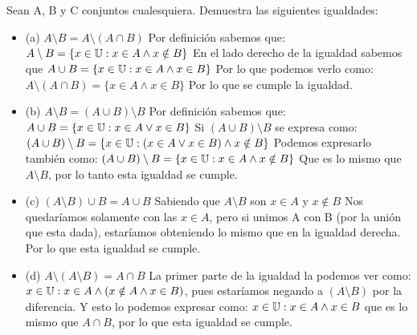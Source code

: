 \section{}
Sean A, B y C conjuntos cualesquiera. Demuestra las siguientes igualdades:
\begin{itemize}
	\item (a) $A \setminus B = A \setminus (A \cap B)$\newline
	Por definición sabemos que: $A \setminus B = \{ x \in \mathbb{U} : x \in A \wedge x \notin B \}$\newline
	En el lado derecho de la igualdad sabemos que \newline
	$A \cup B = \{ x \in \mathbb{U} : x \in A \wedge x \in B \} $\newline
	Por lo que podemos verlo como: $A \setminus (A  \cap B) = \{ x \in A \wedge x \in B \}$\newline
	Por lo que se cumple la igualdad.
	
	
	\item (b) $A \setminus B = (A \cup B) \setminus B$\newline
	Por definición sabemos que:\newline
	$A \cup B = \{x \in \mathbb{U} : x\in A \lor x\in B \}$\newline
	Si $(A \cup B ) \setminus B$ se expresa como:\newline
	$(A \cup B ) \setminus B = \{x \in \mathbb{U} : (x \in A \lor x \in B) \wedge x \notin B \}$\newline
	Podemos expresarlo también como:\newline
	$(A \cup B) \setminus B = \{ x \in \mathbb{U} : x\in A \wedge x \notin B \}$\newline
	Que es lo mismo que $A\setminus B$, por lo tanto esta igualdad se cumple.
	
	\item (c) $(A \setminus B) \cup B = A \cup B$\newline
	Sabiendo que $A \setminus B$ son $x \in A$ y $x \notin B$\newline
	Nos quedaríamos solamente con las $x \in A$, pero si unimos A con B (por la unión que esta dada), estaríamos obteniendo lo mismo que en la igualdad derecha. Por lo que esta igualdad se cumple.
		
	\item (d) $A \setminus (A \setminus B) = A \cap B$\newline
La primer parte de la igualdad la podemos ver como: \newline
$x \in \mathbb{U} : x \in A \wedge (x \notin A \wedge x\in B)$, pues estaríamos negando a $(A\setminus B)$ por la diferencia. Y esto lo podemos expresar como: \newline
	$x \in \mathbb{U} : x\in A \wedge x \in B$ que es lo mismo que $A \cap B$, por lo que esta igualdad se cumple.
	

\end{itemize}
